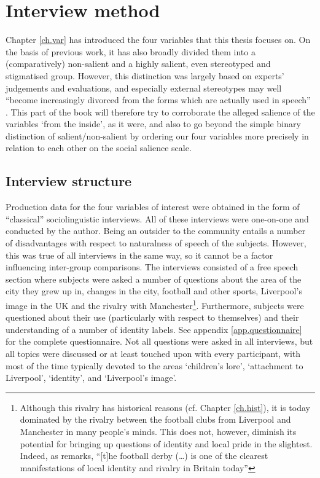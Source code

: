 \chapter{Interview method}\label{ch.prod_method}

Chapter \ref{ch.var} has introduced the four variables that this thesis focuses on.
On the basis of previous work, it has also broadly divided them into a (comparatively) non-salient and a highly salient, even stereotyped and stigmatised group.
However, this distinction was largely based on experts' judgements and evaluations, and especially external stereotypes may well ``become increasingly divorced from the forms which are actually used in speech'' \parencite[180]{labov1972}.
This part of the book will therefore try to corroborate the alleged salience of the variables `from the inside', as it were, and also to go beyond the simple binary distinction of salient/non-salient by ordering our four variables more precisely in relation to each other on the social salience scale.

	\section{Interview structure}\label{sec.prod_method.interview}
	
Production data for the four variables of interest were obtained in the form of ``classical'' sociolinguistic interviews.
All of these interviews were one-on-one and conducted by the author.
Being an outsider to the community entails a number of disadvantages with respect to naturalness of speech of the subjects.
However, this was true of all interviews in the same way, so it cannot be a factor influencing inter-group comparisons.
The interviews consisted of a free speech section where subjects were asked a number of questions about the area of the city they grew up in, changes in the city, football and other sports, Liverpool's image in the UK and the rivalry with Manchester\footnote{Although this rivalry has historical reasons (cf. Chapter \ref{ch.hist}), it is today dominated by the rivalry between the football clubs from Liverpool and Manchester in many people's minds. This does not, however, diminish its potential for bringing up questions of identity and local pride in the slightest. Indeed, as \textcite[97]{beal2010} remarks, ``[t]he football derby (\dots) is one of the clearest manifestations of local identity and rivalry in Britain today''}.
Furthermore, subjects were questioned about their use (particularly with respect to themselves) and their understanding of a number of identity labels.
See appendix \ref{app.questionnaire} for the complete questionnaire.
Not all questions were asked in all interviews, but all topics were discussed or at least touched upon with every participant, with most of the time typically devoted to the areas `children's lore', `attachment to Liverpool', `identity', and `Liverpool's image'.


